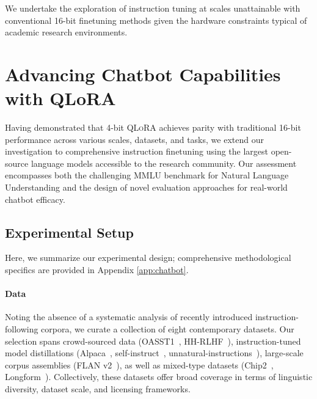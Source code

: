 We undertake the exploration of instruction tuning at scales unattainable with conventional 16-bit finetuning methods given the hardware constraints typical of academic research environments.

\section{Advancing Chatbot Capabilities with QLoRA}
\label{sec:pushing}
Having demonstrated that 4-bit \textsc{QLoRA} achieves parity with traditional 16-bit performance across various scales, datasets, and tasks, we extend our investigation to comprehensive instruction finetuning using the largest open-source language models accessible to the research community. Our assessment encompasses both the challenging MMLU benchmark for Natural Language Understanding and the design of novel evaluation approaches for real-world chatbot efficacy.

\subsection{Experimental Setup} Here, we summarize our experimental design; comprehensive methodological specifics are provided in Appendix \ref{app:chatbot}.

\paragraph{Data} Noting the absence of a systematic analysis of recently introduced instruction-following corpora, we curate a collection of eight contemporary datasets. Our selection spans crowd-sourced data (OASST1~\citep{kopf2023openassistant}, HH-RLHF~\citep{bai2022training}), instruction-tuned model distillations (Alpaca~\citep{alpaca}, self-instruct~\citep{wang2022self}, unnatural-instructions~\citep{honovich2022unnatural}), large-scale corpus assemblies (FLAN v2~\citep{chung2022scaling}), as well as mixed-type datasets (Chip2~\citep{laion2023}, Longform~\citep{koksal2023longform}). Collectively, these datasets offer broad coverage in terms of linguistic diversity, dataset scale, and licensing frameworks.

